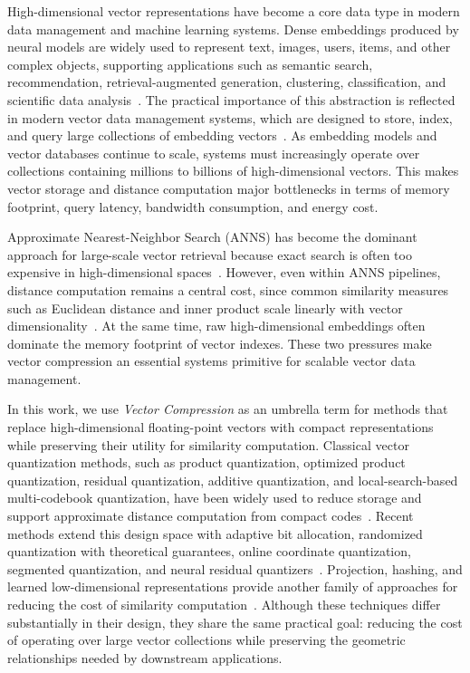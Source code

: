 \documentclass[sigconf]{acmart}
\begin{document}
High-dimensional vector representations have become a core data type in modern data management and machine learning systems. 
Dense embeddings produced by neural models are widely used to represent text, images, users, items, and other complex objects, supporting applications such as semantic search, recommendation, retrieval-augmented generation, clustering, classification, and scientific data analysis~\cite{huang2020embedding,rec2,lewis2020rag,gao2023ragsurvey}. 
The practical importance of this abstraction is reflected in modern vector data management systems, which are designed to store, index, and query large collections of embedding vectors~\cite{milvus,manu,adbv,vbase}. 
As embedding models and vector databases continue to scale, systems must increasingly operate over collections containing millions to billions of high-dimensional vectors. 
This makes vector storage and distance computation major bottlenecks in terms of memory footprint, query latency, bandwidth consumption, and energy cost.

Approximate Nearest-Neighbor Search (ANNS) has become the dominant approach for large-scale vector retrieval because exact search is often too expensive in high-dimensional spaces~\cite{tkde-survey,ann-benchmark,hnsw,faiss}. 
However, even within ANNS pipelines, distance computation remains a central cost, since common similarity measures such as Euclidean distance and inner product scale linearly with vector dimensionality~\cite{adsampling,dco,wang2024dimensionality}. 
At the same time, raw high-dimensional embeddings often dominate the memory footprint of vector indexes. 
These two pressures make vector compression an essential systems primitive for scalable vector data management.

In this work, we use \emph{Vector Compression} as an umbrella term for methods that replace high-dimensional floating-point vectors with compact representations while preserving their utility for similarity computation. 
Classical vector quantization methods, such as product quantization, optimized product quantization, residual quantization, additive quantization, and local-search-based multi-codebook quantization, have been widely used to reduce storage and support approximate distance computation from compact codes~\cite{pq,opq,rq,lsq,lsq++}. 
Recent methods extend this design space with adaptive bit allocation, randomized quantization with theoretical guarantees, online coordinate quantization, segmented quantization, and neural residual quantizers~\cite{vaq,rabitq,zandieh2025turboquant,li2025saq,qinco1,qinco2}. 
Projection, hashing, and learned low-dimensional representations provide another family of approaches for reducing the cost of similarity computation~\cite{lsh,pmlsh,wang2024dimensionality,seanet}. 
Although these techniques differ substantially in their design, they share the same practical goal: reducing the cost of operating over large vector collections while preserving the geometric relationships needed by downstream applications.
\end{document}

